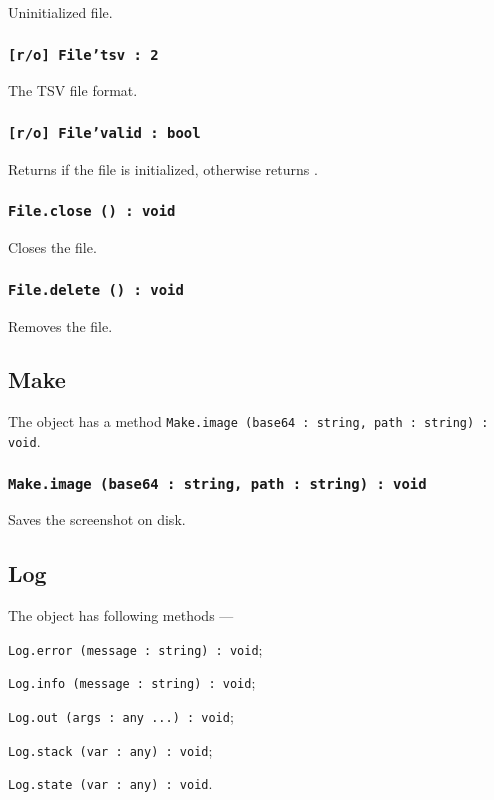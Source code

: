 Uninitialized file.

\subsubsection{\texttt{[r/o] File'tsv : 2}}

The TSV file format.

\subsubsection{\texttt{[r/o] File'valid : bool}}

Returns \true{} if the file is initialized, otherwise returns \false.

\subsubsection{\texttt{File.close () : void}}

Closes the file.

\subsubsection{\texttt{File.delete () : void}}

Removes the file.

\subsection{{\color{orange} Make}}

The object \make{} has a method \texttt{Make.image (base64 : string, path : string) : void}.

\subsubsection{\texttt{Make.image (base64 : string, path : string) : void}}

Saves the screenshot on disk.

\subsection{{\color{orange} Log}}

The object \logtype{} has following methods —
\begin{icItems}
	\item \texttt{Log.error (message : string) : void};
	\item \texttt{Log.info (message : string) : void};
	\item \texttt{Log.out (args : any ...) : void};
	\item \texttt{Log.stack (var : any) : void};
	\item \texttt{Log.state (var : any) : void}.
\end{icItems}

